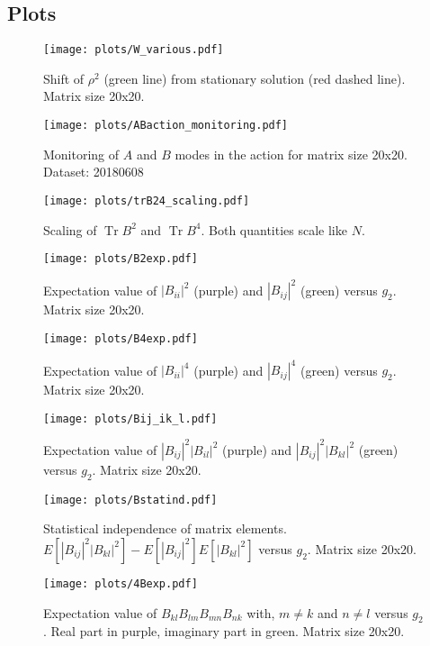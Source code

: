 \documentclass[12pt,a4paper]{article}
\DeclareMathOperator{\Tr}{Tr}
\begin{document}
\newpage

\subsection{Plots}
\begin{figure}[hp]
\centering
\texttt{[image: plots/W\_various.pdf]}
\caption{Shift of $\rho^2$ (green line) from stationary solution (red dashed line). Matrix size 20x20.}
\label{fig:Wvar}
\end{figure}
\begin{figure}[hp]
\centering
\texttt{[image: plots/ABaction\_monitoring.pdf]}
\caption{Monitoring of $A$ and $B$ modes in the action for matrix size 20x20. Dataset: 20180608}
\label{fig:ABaction}
\end{figure}
\begin{figure}[hp]
\centering
\texttt{[image: plots/trB24\_scaling.pdf]}
\caption{Scaling of $\Tr B^2$ and $\Tr B^4$. Both quantities scale like $N$.}
\label{fig:trB24scal}
\end{figure}
\begin{figure}[hp]
\centering
\texttt{[image: plots/B2exp.pdf]}
\caption{Expectation value of $|B_{ii}|^2$ (purple) and $|B_{ij}|^2$ (green) versus $g_2$. Matrix size 20x20.}
\label{fig:B2exp}
\end{figure}
\begin{figure}[hp]
\centering
\texttt{[image: plots/B4exp.pdf]}
\caption{Expectation value of $|B_{ii}|^4$ (purple) and $|B_{ij}|^4$ (green) versus $g_2$. Matrix size 20x20.}
\label{fig:B4exp}
\end{figure}
\begin{figure}[hp]
\centering
\texttt{[image: plots/Bij\_ik\_l.pdf]}
\caption{Expectation value of $|B_{ij}|^2 |B_{il}|^2$ (purple) and $|B_{ij}|^2 |B_{kl}|^2$ (green) versus $g_2$. Matrix size 20x20.}
\label{fig:Bij_ik_l}
\end{figure}
\begin{figure}[hp]
\centering
\texttt{[image: plots/Bstatind.pdf]}
\caption{Statistical independence of matrix elements. $E[|B_{ij}|^2|B_{kl}|^2] - E[|B_{ij}|^2]E[|B_{kl}|^2]$ versus $g_2$. Matrix size 20x20.}
\label{fig:Bstatind}
\end{figure}
\begin{figure}[hp]
\centering
\texttt{[image: plots/4Bexp.pdf]}
\caption{Expectation value of $B_{kl} B_{lm} B_{mn} B_{nk}$ with, $m \neq k$ and $n \neq l$ versus $g_2$. Real part in purple, imaginary part in green. Matrix size 20x20.}
\label{fig:4Bexp}
\end{figure}
\newpage
\end{document}
